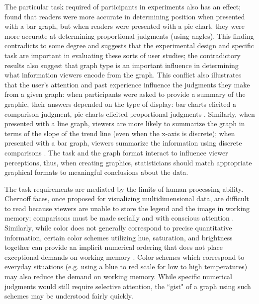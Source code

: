 \documentclass[11pt]{isuthesis}\usepackage[]{graphicx}\usepackage[]{color}
\begin{document}
The particular task required of participants in experiments also has an effect; \citet{simkin1987information} found that readers were more accurate in determining position when presented with a bar graph, but when readers were presented with a pie chart, they were more accurate at determining proportional judgments (using angles). This finding contradicts \citet{cleveland:1984} to some degree and suggests that the experimental design and specific task are important in evaluating these sorts of user studies; the contradictory results also suggest that graph type is an important influence in determining what information viewers encode from the graph. This conflict also illustrates that the user's attention and past experience influence the judgments they make from a given graph: when participants were asked to provide a summary of the graphic, their answers depended on the type of display: bar charts elicited a comparison judgment, pie charts elicited proportional judgments \citep{simkin1987information}. Similarly, when presented with a line graph, viewers are more likely to summarize the graph in terms of the slope of the trend line (even when the x-axis is discrete); when presented with a bar graph, viewers summarize the information using discrete comparisons \citep{carswell1987information, shah2005cambridge}. The task and the graph format interact to influence viewer perceptions, thus, when creating graphics, statisticians should match appropriate graphical formats to meaningful conclusions about the data. 

The task requirements are mediated by the limits of human processing ability. Chernoff faces, once proposed for visualizing multidimensional data, are difficult to read because viewers are unable to store the legend and the image in working memory; comparisons must be made serially and with conscious attention \citep{shah2005cambridge}. Similarly, while color does not generally correspond to precise quantitative information, certain color schemes utilizing hue, saturation, and brightness together can provide an implicit numerical ordering that does not place exceptional demands on working memory \citep{shah2005cambridge}. Color schemes which correspond to everyday situations (e.g. using a blue to red scale for low to high temperatures) may also reduce the demand on working memory. While specific numerical judgments would still require selective attention, the ``gist" of a graph using such schemes may be understood fairly quickly. 
\end{document}
